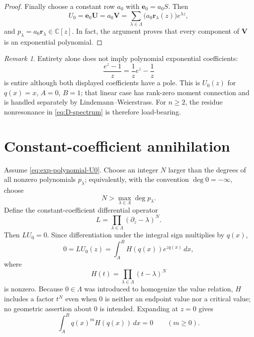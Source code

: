 \documentclass[11pt]{article}
\numberwithin{equation}{section}
\theoremstyle{definition}
\theoremstyle{remark}
\newtheorem{remark}[remark]{Remark}
\newcommand{\C}{\mathbb C}
\begin{document}
\begin{proof}
Finally choose a constant row $a_0$ with $\mathbf e_0=a_0S$.  Then
\[
  U_0=\mathbf e_0\mathbf U=a_0\mathbf V
  =\sum_{\lambda\in\Lambda}
   \bigl(a_0\mathbf r_\lambda(z)\bigr)e^{\lambda z},
\]
and $p_\lambda=a_0\mathbf r_\lambda\in\C[z]$.  In fact, the argument proves
that every component of $\mathbf V$ is an exponential polynomial.
\end{proof}

\begin{remark}\label{rem:entire-rational-coefficients}
Entirety alone does not imply polynomial exponential coefficients:
\[
  \frac{e^z-1}{z}
  =\frac1z e^z-\frac1z
\]
is entire although both displayed coefficients have a pole.  This is
$U_0(z)$ for $q(x)=x$, $A=0$, $B=1$; that linear case has rank-zero moment
connection and is handled separately by Lindemann--Weierstrass.  For
$n\ge2$, the residue nonresonance in \eqref{eq:D-spectrum} is therefore
load-bearing.
\end{remark}

\section{Constant-coefficient annihilation}\label{sec:exp-annihilation}

Assume \eqref{eq:exp-polynomial-U0}.  Choose an integer $N$ larger than the degrees of all nonzero polynomials $p_\lambda$; equivalently, with the convention $\deg0=-\infty$, choose
\[
  N>\max_{\lambda\in\Lambda}\deg p_\lambda.
\]
Define the constant-coefficient differential operator
\begin{equation}\label{eq:L-operator}
  L=\prod_{\lambda\in\Lambda}(\partial_z-\lambda)^N.
\end{equation}
Then $LU_0=0$.  Since differentiation under the integral sign multiplies by $q(x)$,
\begin{equation}\label{eq:annihilated-integral}
  0
  =LU_0(z)
  =\int_A^B H(q(x))e^{zq(x)}\,dx,
\end{equation}
where
\begin{equation}\label{eq:H-def}
  H(t)=\prod_{\lambda\in\Lambda}(t-\lambda)^N
\end{equation}
is nonzero.  Because $0\in\Lambda$ was introduced to homogenize the value
relation, $H$ includes a factor $t^N$ even when $0$ is neither an endpoint
value nor a critical value; no geometric assertion about $0$ is intended.
Expanding at $z=0$ gives
\begin{equation}\label{eq:phase-moments}
  \int_A^B q(x)^mH(q(x))\,dx=0
  \qquad(m\ge0).
\end{equation}
\end{document}
